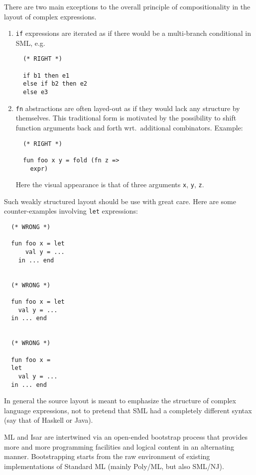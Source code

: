 \begin{isabellebody}
\begin{isamarkuptext}
  \medskip There are two main exceptions to the overall principle of
  compositionality in the layout of complex expressions.

  \begin{enumerate}

  \item \verb|if| expressions are iterated as if there would be
  a multi-branch conditional in SML, e.g.

  \begin{verbatim}
  (* RIGHT *)

  if b1 then e1
  else if b2 then e2
  else e3
  \end{verbatim}

  \item \verb|fn| abstractions are often layed-out as if they
  would lack any structure by themselves.  This traditional form is
  motivated by the possibility to shift function arguments back and
  forth wrt.\ additional combinators.  Example:

  \begin{verbatim}
  (* RIGHT *)

  fun foo x y = fold (fn z =>
    expr)
  \end{verbatim}

  Here the visual appearance is that of three arguments \verb|x|,
  \verb|y|, \verb|z|.

  \end{enumerate}

  Such weakly structured layout should be use with great care.  Here
  are some counter-examples involving \verb|let| expressions:

  \begin{verbatim}
  (* WRONG *)

  fun foo x = let
      val y = ...
    in ... end


  (* WRONG *)

  fun foo x = let
    val y = ...
  in ... end


  (* WRONG *)

  fun foo x =
  let
    val y = ...
  in ... end
  \end{verbatim}

  \medskip In general the source layout is meant to emphasize the
  structure of complex language expressions, not to pretend that SML
  had a completely different syntax (say that of Haskell or Java).%
\end{isamarkuptext}%
\isamarkuptrue%
%
\isamarkuptrue%
%
\begin{isamarkuptext}%
ML and Isar are intertwined via an open-ended bootstrap
  process that provides more and more programming facilities and
  logical content in an alternating manner.  Bootstrapping starts from
  the raw environment of existing implementations of Standard ML
  (mainly Poly/ML, but also SML/NJ).


\end{isamarkuptext}
\end{isabellebody}
